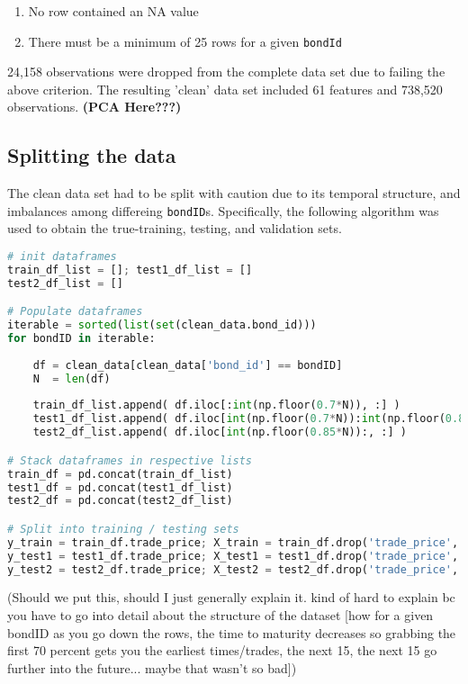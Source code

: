 \documentclass{article}
\newcommand{\code}[1]{\colorbox{light-gray}{\texttt{#1}}}
\begin{document}
\begin{enumerate}
  \item No row contained an NA value
  \item There must be a minimum of 25 rows for a given \code{bondId}
\end{enumerate}

24,158 observations were dropped from the complete data set due to failing the above criterion. The resulting 'clean' data set included 61 features and 738,520 observations. 
\textbf{(PCA Here???)} 

\subsection{Splitting the data}

The clean data set had to be split with caution due to its temporal structure, and imbalances among differeing \code{bondID}s. Specifically, the following algorithm was used to obtain the true-training, testing, and validation sets. \\

\begin{lstlisting}[language=Python]
# init dataframes
train_df_list = []; test1_df_list = [] 
test2_df_list = []

# Populate dataframes
iterable = sorted(list(set(clean_data.bond_id)))
for bondID in iterable:
    
    df = clean_data[clean_data['bond_id'] == bondID]
    N  = len(df)
    
    train_df_list.append( df.iloc[:int(np.floor(0.7*N)), :] )
    test1_df_list.append( df.iloc[int(np.floor(0.7*N)):int(np.floor(0.85*N)), :] )
    test2_df_list.append( df.iloc[int(np.floor(0.85*N)):, :] )

# Stack dataframes in respective lists
train_df = pd.concat(train_df_list)
test1_df = pd.concat(test1_df_list)
test2_df = pd.concat(test2_df_list)

# Split into training / testing sets
y_train = train_df.trade_price; X_train = train_df.drop('trade_price', axis=1)
y_test1 = test1_df.trade_price; X_test1 = test1_df.drop('trade_price', axis=1)
y_test2 = test2_df.trade_price; X_test2 = test2_df.drop('trade_price', axis=1)
\end{lstlisting}

(Should we put this, should I just generally explain it. kind of hard to explain bc you have to go into detail about the structure of the dataset [how for a given bondID as you go down the rows, the time to maturity decreases so grabbing the first 70 percent gets you the earliest times/trades, the next 15, the next 15 go further into the future... maybe that wasn't so bad])
\end{document}
